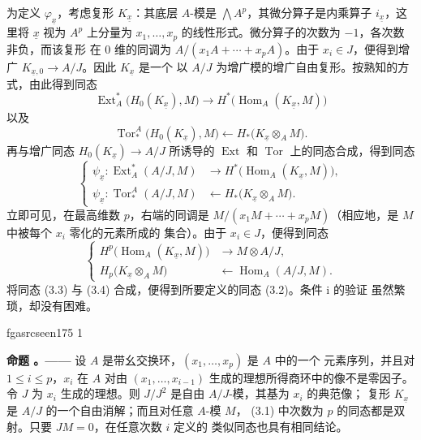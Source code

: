 \documentclass[12pt,twoside,openany]{book}
\numberwithin{equation}{section}
\newcommand{\fgaunitid}{unbound}
\newcommand{\src}[1]{%
  \phantomsection
  \hypertarget{src:\fgaunitid:#1}{}%
  \hypertarget{fga.\fgaunitid.p#1}{}%
  \ifcsname fgasrcseen#1\endcsname\else
    \expandafter\gdef\csname fgasrcseen#1\endcsname{1}%
    \hypertarget{src:#1}{}%
  \fi
  \marginpar{\raggedleft\footnotesize\sffamily #1}%
}
\theoremstyle{plain}
\theoremstyle{definition}
\theoremstyle{remark}
\newcommand{\result}[2]{%
  \par\medskip\noindent\textbf{#1%
  \if\relax\detokenize{#2}\relax\else\space#2\fi。——}\enspace
}
\begin{document}
为定义 $\varphi_{\underline{x}}$，考虑复形 $K_{\underline{x}}$：其底层
$A$-模是 $\bigwedge A^{p}$，其微分算子是内乘算子
$i_{\underline{x}}$，这里将 $\underline{x}$ 视为 $A^{p}$ 上分量为
$x_1,\ldots,x_p$ 的线性形式。微分算子的次数为 $-1$，各次数非负，而该复形
在 $0$ 维的同调为 $A/(x_1A+\cdots+x_pA)$。由于 $x_i\in J$，便得到增广
$K_{\underline{x},0}\longrightarrow A/J$。因此 $K_{\underline{x}}$ 是一个
以 $A/J$ 为增广模的增广自由复形。按熟知的方式，由此得到同态
\[
\operatorname{Ext}_{A}^{*}\bigl(H_0(K_{\underline{x}}),M\bigr)
\longrightarrow
H^{*}\bigl(\operatorname{Hom}_{A}(K_{\underline{x}},M)\bigr)
\]
以及
\[
\operatorname{Tor}_{*}^{A}\bigl(H_0(K_{\underline{x}}),M\bigr)
\longleftarrow
H_{*}\bigl(K_{\underline{x}}\otimes_A M\bigr).
\]
再与增广同态 $H_0(K_{\underline{x}})\longrightarrow A/J$ 所诱导的
$\operatorname{Ext}$ 和 $\operatorname{Tor}$ 上的同态合成，得到同态
\begin{equation}\tag{3.3}
\left\{
\begin{aligned}
\psi_{\underline{x}}:
\operatorname{Ext}_{A}^{*}(A/J,M)
&\longrightarrow H^{*}\bigl(\operatorname{Hom}_{A}(K_{\underline{x}},M)\bigr),\\
\psi_{\underline{x}}:
\operatorname{Tor}_{*}^{A}(A/J,M)
&\longleftarrow H_{*}\bigl(K_{\underline{x}}\otimes_A M\bigr).
\end{aligned}
\right.
\end{equation}
立即可见，在最高维数 $p$，右端的同调是
$M/(x_1M+\cdots+x_pM)$（相应地，是 $M$ 中被每个 $x_i$ 零化的元素所成的
集合）。由于 $x_i\in J$，便得到同态
\begin{equation}\tag{3.4}
\left\{
\begin{aligned}
H^{p}\bigl(\operatorname{Hom}_{A}(K_{\underline{x}},M)\bigr)
&\longrightarrow M\otimes A/J,\\
H_{p}\bigl(K_{\underline{x}}\otimes_A M\bigr)
&\longleftarrow\operatorname{Hom}_{A}(A/J,M).
\end{aligned}
\right.
\end{equation}
将同态 (3.3) 与 (3.4) 合成，便得到所要定义的同态 (3.2)。条件 i 的验证
虽然繁琐，却没有困难。

\src{175}
\result{命题}{4} 设 $A$ 是带幺交换环，$(x_1,\ldots,x_p)$ 是 $A$ 中的一个
元素序列，并且对 $1\leq i\leq p$，$x_i$ 在 $A$ 对由
$(x_1,\ldots,x_{i-1})$ 生成的理想所得商环中的像不是零因子。令 $J$ 为
$x_i$ 生成的理想。则 $J/J^{2}$ 是自由 $A/J$-模，其基为 $x_i$ 的典范像；
复形 $K_{\underline{x}}$ 是 $A/J$ 的一个自由消解；而且对任意 $A$-模 $M$，
(3.1) 中次数为 $p$ 的同态都是双射。只要 $J M=0$，在任意次数 $i$ 定义的
类似同态也具有相同结论。
\end{document}
